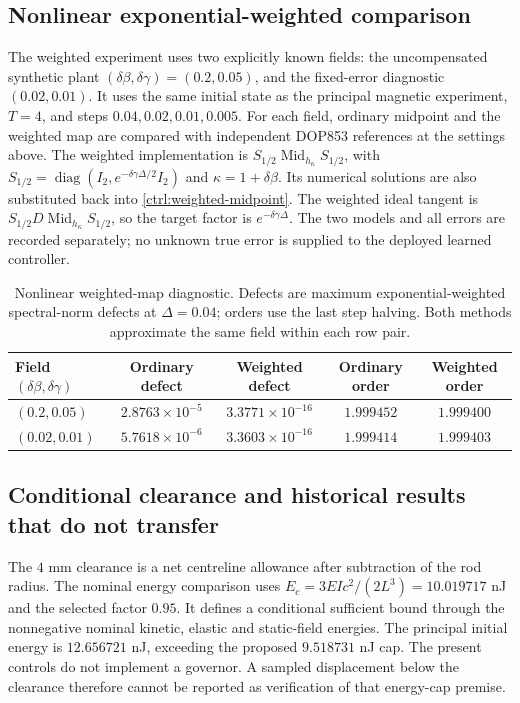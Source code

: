 \subsection{Nonlinear exponential-weighted comparison}
\label{sx:framework-weighted}
The weighted experiment uses two explicitly known fields: the
uncompensated synthetic plant $(\delta\beta,\delta\gamma)=(0.2,0.05)$,
and the fixed-error diagnostic $(0.02,0.01)$. It uses the same initial
state as the principal magnetic experiment, $T=4$, and steps
$0.04,0.02,0.01,0.005$. For each field, ordinary midpoint and the weighted
map are compared with independent DOP853 references at the settings above.
The weighted implementation is
$S_{1/2}\operatorname{Mid}_{h_\kappa}S_{1/2}$, with
$S_{1/2}=\operatorname{diag}(I_2,e^{-\delta\gamma\Delta/2}I_2)$
and $\kappa=1+\delta\beta$. Its numerical solutions are also substituted
back into \eqref{ctrl:weighted-midpoint}. The weighted ideal tangent is
$S_{1/2}D\operatorname{Mid}_{h_\kappa}S_{1/2}$, so the target factor is
$e^{-\delta\gamma\Delta}$. The two models and all errors are recorded
separately; no unknown true error is supplied to the deployed learned
controller.

\begin{table}[t]
\centering
\caption{Nonlinear weighted-map diagnostic. Defects are maximum exponential-weighted spectral-norm defects at $\Delta=0.04$; orders use the last step halving. Both methods approximate the same field within each row pair.}
\label{num:nonlinear-weighted}
\begin{tabular}{lcccc}
\toprule
Field $(\delta\beta,\delta\gamma)$ & Ordinary defect & Weighted defect & Ordinary order & Weighted order\\
\midrule
$(0.2,0.05)$ & $2.8763\times10^{-5}$ & $3.3771\times10^{-16}$ & $1.999452$ & $1.999400$ \\
$(0.02,0.01)$ & $5.7618\times10^{-6}$ & $3.3603\times10^{-16}$ & $1.999414$ & $1.999403$ \\
\bottomrule
\end{tabular}
\end{table}


\subsection{Conditional clearance and historical results that do not transfer}
\label{sx:migration}
The $4$ mm clearance is a net centreline allowance after subtraction
of the rod radius. The nominal energy comparison uses
$E_c=3EIc^2/(2L^3)=10.019717$ nJ and the selected factor $0.95$.
It defines a conditional sufficient bound through the nonnegative
nominal kinetic, elastic and static-field energies. The principal
initial energy is $12.656721$ nJ, exceeding the proposed
$9.518731$ nJ cap. The present controls do not implement a
governor. A sampled displacement below the clearance therefore
cannot be reported as verification of that energy-cap premise.

